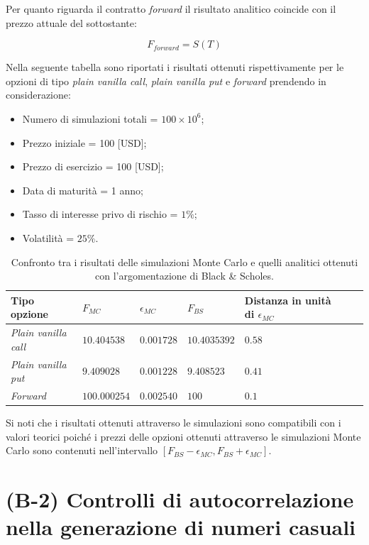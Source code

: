 Per quanto riguarda il contratto \textit{forward} il risultato analitico coincide con il prezzo attuale del sottostante:

\begin{equation}
    F_{forward}=S(T) 
\end{equation}

Nella seguente tabella sono riportati i risultati ottenuti rispettivamente per le opzioni di tipo \textit{plain vanilla call}, \textit{plain vanilla put} e \textit{forward} prendendo in considerazione:
\begin{itemize}
    \item Numero di simulazioni totali = $100 \times 10^6$;
    \item Prezzo iniziale = 100 [USD];
    \item Prezzo di esercizio = 100 [USD];
    \item Data di maturità = 1 anno; 
    \item Tasso di interesse privo di rischio = $1\%$;
    \item Volatilità = $25\%$.
\end{itemize}

\begin{table}[t]
\small
\centering
\begin{tabular}{|l||l|l|l|l|l|l|}
\hline
\textbf{Tipo opzione} & $F_{MC}$ & $\epsilon_{MC}$ & $F_{BS}$ & Distanza in unità di $\epsilon_{MC}$ \\
\hline \hline
\textit{Plain vanilla call} & $10.404538$ & $0.001728$ &
$10.4035392$ & $0.58$\\ \hline
\textit{Plain vanilla put} & $9.409028$ & $0.001228$ & $9.408523$ & $0.41$\\ \hline
\textit{Forward} & $100.000254$ & $0.002540$ & $100$ & $0.1$\\ \hline
\end{tabular}
\caption{Confronto tra i risultati delle simulazioni Monte Carlo e quelli analitici ottenuti con l'argomentazione di Black \& Scholes.}
\label{tab:BS-MC}
\end{table}

Si noti che i risultati ottenuti attraverso le simulazioni sono compatibili con i valori teorici poiché i prezzi delle opzioni ottenuti attraverso le simulazioni Monte Carlo sono contenuti nell'intervallo $[F_{BS}-\epsilon_{MC},F_{BS}+\epsilon_{MC}]$.

\section{(B-2) Controlli di autocorrelazione nella generazione di numeri casuali}

